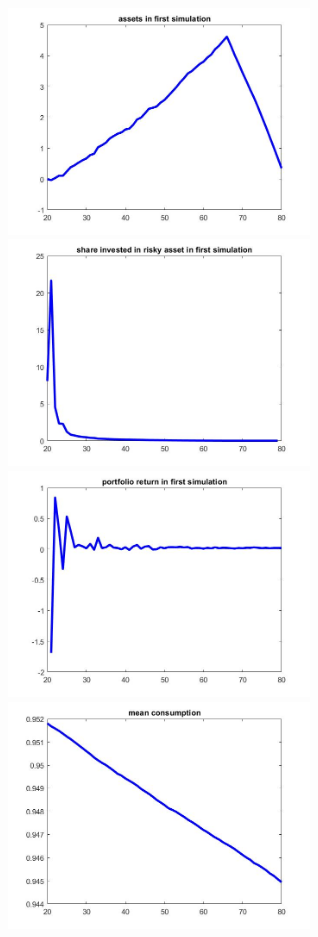 \documentclass[a4paper,9pt, parskip=half-]{scrartcl}
\begin{document}
\begin{center}
\includegraphics[width=8cm]{Pic5}\includegraphics[width=8cm]{Pic6}\\
\includegraphics[width=8cm]{Pic7}\includegraphics[width=8cm]{Pic8}\\

\end{center}
\end{document}
